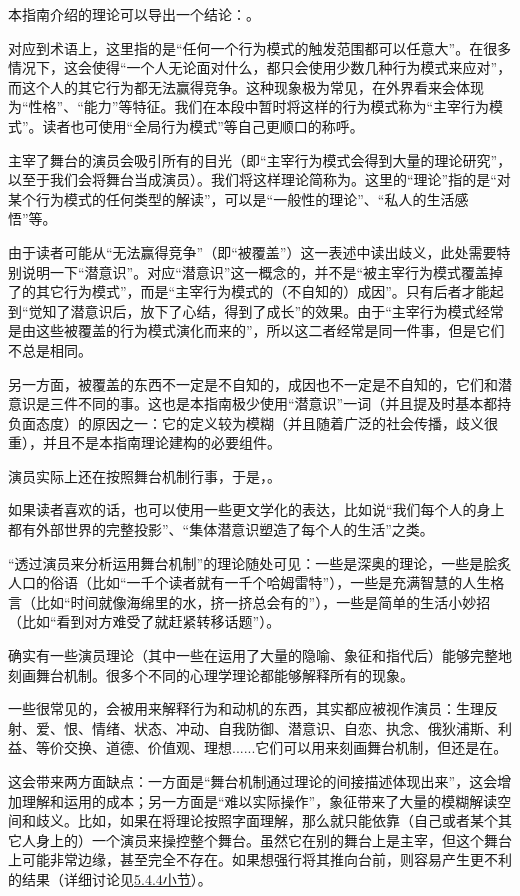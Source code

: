 本指南介绍的理论可以导出一个结论：。
\begin{explain}
对应到术语上，这里指的是“任何一个行为模式的触发范围都可以任意大”。在很多情况下，这会使得“一个人无论面对什么，都只会使用少数几种行为模式来应对”，而这个人的其它行为都无法赢得竞争。这种现象极为常见，在外界看来会体现为“性格”、“能力”等特征。我们在本段中暂时将这样的行为模式称为“主宰行为模式”。读者也可使用“全局行为模式”等自己更顺口的称呼。

主宰了舞台的演员会吸引所有的目光（即“主宰行为模式会得到大量的理论研究”，以至于我们会将舞台当成演员）。我们将这样理论简称为。这里的“理论”指的是“对某个行为模式的任何类型的解读”，可以是“一般性的理论”、“私人的生活感悟”等。

由于读者可能从“无法赢得竞争”（即“被覆盖”）这一表述中读出歧义，此处需要特别说明一下“潜意识”。对应“潜意识”这一概念的，并不是“被主宰行为模式覆盖掉了的其它行为模式”，而是“主宰行为模式的（不自知的）成因”。只有后者才能起到“觉知了潜意识后，放下了心结，得到了成长”的效果。由于“主宰行为模式经常是由这些被覆盖的行为模式演化而来的”，所以这二者经常是同一件事，但是它们不总是相同。

另一方面，被覆盖的东西不一定是不自知的，成因也不一定是不自知的，它们和潜意识是三件不同的事。这也是本指南极少使用“潜意识”一词（并且提及时基本都持负面态度）的原因之一：它的定义较为模糊（并且随着广泛的社会传播，歧义很重），并且不是本指南理论建构的必要组件。
\end{explain}
演员实际上还在按照舞台机制行事，于是，。
\begin{explain}
如果读者喜欢的话，也可以使用一些更文学化的表达，比如说“我们每个人的身上都有外部世界的完整投影”、“集体潜意识塑造了每个人的生活”之类。

“透过演员来分析运用舞台机制”的理论随处可见：一些是深奥的理论，一些是脍炙人口的俗语（比如“一千个读者就有一千个哈姆雷特”），一些是充满智慧的人生格言（比如“时间就像海绵里的水，挤一挤总会有的”），一些是简单的生活小妙招（比如“看到对方难受了就赶紧转移话题”）。

确实有一些演员理论（其中一些在运用了大量的隐喻、象征和指代后）能够完整地刻画舞台机制。很多个不同的心理学理论都能够解释所有的现象。

一些很常见的，会被用来解释行为和动机的东西，其实都应被视作演员：生理反射、爱、恨、情绪、状态、冲动、自我防御、潜意识、自恋、执念、俄狄浦斯、利益、等价交换、道德、价值观、理想......它们可以用来刻画舞台机制，但还是在。%

这会带来两方面缺点：一方面是“舞台机制通过理论的间接描述体现出来”，这会增加理解和运用的成本；另一方面是“难以实际操作”，象征带来了大量的模糊解读空间和歧义。比如，如果在将理论按照字面理解，那么就只能依靠（自己或者某个其它人身上的）一个演员来操控整个舞台。虽然它在别的舞台上是主宰，但这个舞台上可能非常边缘，甚至完全不存在。如果想强行将其推向台前，则容易产生更不利的结果（详细讨论见\hyperref[sec:多行为的形成]{5.4.4小节}）。
\end{explain}
